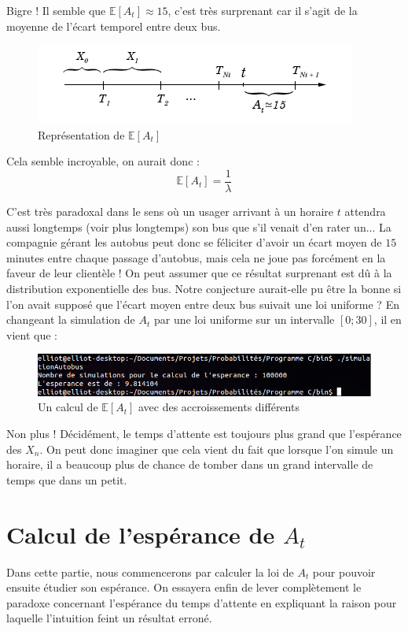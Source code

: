\documentclass[a4paper, titlepage]{livret} %
\begin{document}
			Bigre ! Il semble que $\mathbb{E}[A_{t}] \approx 15$, c'est très surprenant car il s'agit de la moyenne de l'écart temporel entre deux bus.

			\begin{figure}[!ht]
					\centering
  						\includegraphics[scale = 0.45]{g5.png}
  						\caption{Représentation de $\mathbb{E}[A_{t}]$}
			\end{figure}
			Cela semble incroyable, on aurait donc :
			\[
				\mathbb{E}[A_{t}] = \frac{1}{\lambda}
			\]

			C'est très paradoxal dans le sens où un usager arrivant à un horaire $t$ attendra aussi longtemps (voir plus longtemps) son bus que s'il venait d'en rater un...
			La compagnie gérant les autobus peut donc se féliciter d'avoir un écart moyen de $15$ minutes entre chaque passage d'autobus, mais cela ne joue pas forcément en la faveur de leur clientèle !
			On peut assumer que ce résultat surprenant est dû à la distribution exponentielle des bus.
			Notre conjecture aurait-elle pu être la bonne si l'on avait supposé que l'écart moyen entre deux bus suivait une loi uniforme ?
			En changeant la simulation de $A_{t}$ par une loi uniforme sur un intervalle $[0;30]$, il en vient que :
			\begin{figure}[!ht]
				\centering
  					\includegraphics[scale = 0.38]{screen3.png}
  					\caption{Un calcul de $\mathbb{E}[A_{t}]$ avec des accroissements différents}
			\end{figure}

			Non plus ! 
			Décidément, le temps d'attente est toujours plus grand que l'espérance des $X_{n}$.
			On peut donc imaginer que cela vient du fait que lorsque l'on simule un horaire, il a beaucoup plus de chance de tomber dans un grand intervalle de temps que dans un petit.


	\chapter{Calcul de l'espérance de $A_{t}$}
		Dans cette partie, nous commencerons par calculer la loi de $A_{t}$ pour pouvoir ensuite étudier son espérance.
		On essayera enfin de lever complètement le paradoxe concernant l'espérance du temps d'attente en expliquant la raison pour laquelle l'intuition feint un résultat erroné.
	
\end{document}
